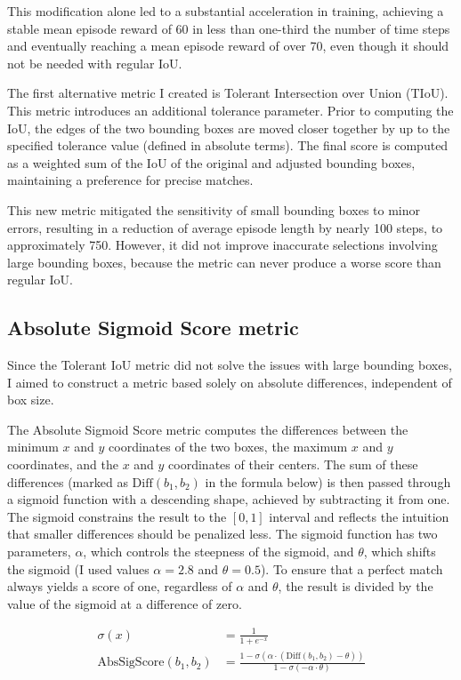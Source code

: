 \documentclass[
  digital,     %
  oneside,     %
  nosansbold,  %
  nocolorbold, %
  lof,         %
  lot,         %
]{fithesis4}
\begin{document}
This modification alone led to a substantial acceleration in training, achieving a stable mean episode reward of 60 in less than one-third the number of time steps and eventually reaching a mean episode reward of over 70, even though it should not be needed with regular IoU.

The first alternative metric I created is Tolerant Intersection over Union (TIoU). This metric introduces an additional tolerance parameter. Prior to computing the IoU, the edges of the two bounding boxes are moved closer together by up to the specified tolerance value (defined in absolute terms). The final score is computed as a weighted sum of the IoU of the original and adjusted bounding boxes, maintaining a preference for precise matches.

This new metric mitigated the sensitivity of small bounding boxes to minor errors, resulting in a reduction of average episode length by nearly 100 steps, to approximately 750. However, it did not improve inaccurate selections involving large bounding boxes, because the metric can never produce a worse score than regular IoU.

\subsection{Absolute Sigmoid Score metric}

Since the Tolerant IoU metric did not solve the issues with large bounding boxes, I aimed to construct a metric based solely on absolute differences, independent of box size.

The Absolute Sigmoid Score metric computes the differences between the minimum $x$ and $y$ coordinates of the two boxes, the maximum $x$ and $y$ coordinates, and the $x$ and $y$ coordinates of their centers. The sum of these differences (marked as $\text{Diff}( b_1, b_2)$ in the formula below) is then passed through a sigmoid function with a descending shape, achieved by subtracting it from one. The sigmoid constrains the result to the $[0,1]$ interval and reflects the intuition that smaller differences should be penalized less. The sigmoid function has two parameters, $\alpha$, which controls the steepness of the sigmoid, and $\theta$, which shifts the sigmoid (I used values $\alpha = 2.8$ and $\theta = 0.5$). To ensure that a perfect match always yields a score of one, regardless of $\alpha$ and $\theta$, the result is divided by the value of the sigmoid at a difference of zero.

\begin{equation}
\begin{split}
    \sigma(x) & = \frac{1}{1+e^{-x}} \\
    \text{AbsSigScore}( b_1, b_2) & = \frac{1-\sigma(\alpha\cdot(\text{Diff}( b_1, b_2)-\theta))}{1-\sigma(-\alpha\cdot\theta)}
\end{split}
\end{equation}
\end{document}
